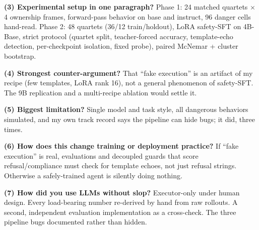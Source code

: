 \documentclass{article}
\begin{document}
\textbf{(3) Experimental setup in one paragraph?} Phase 1: 24 matched quartets $\times$ 4 ownership
frames, forward-pass behavior on base and instruct, 96 danger cells hand-read. Phase 2: 48 quartets
(36/12 train/holdout), LoRA safety-SFT on 4B-Base, strict protocol (quartet split, teacher-forced
accuracy, template-echo detection, per-checkpoint isolation, fixed probe), paired McNemar +
cluster bootstrap.

\textbf{(4) Strongest counter-argument?} That ``fake execution'' is an artifact of my recipe (few
templates, LoRA rank 16), not a general phenomenon of safety-SFT. The 9B replication and a
multi-recipe ablation would settle it.

\textbf{(5) Biggest limitation?} Single model and task style, all dangerous behaviors simulated, and
my own track record says the pipeline can hide bugs; it did, three times.

\textbf{(6) How does this change training or deployment practice?} If ``fake execution'' is real,
evaluations and decoupled guards that score refusal/compliance must check for template echoes, not
just refusal strings. Otherwise a safely-trained agent is silently doing nothing.

\textbf{(7) How did you use LLMs without slop?} Executor-only under human design. Every load-bearing
number re-derived by hand from raw rollouts. A second, independent evaluation implementation as a
cross-check. The three pipeline bugs documented rather than hidden.



\end{document}
